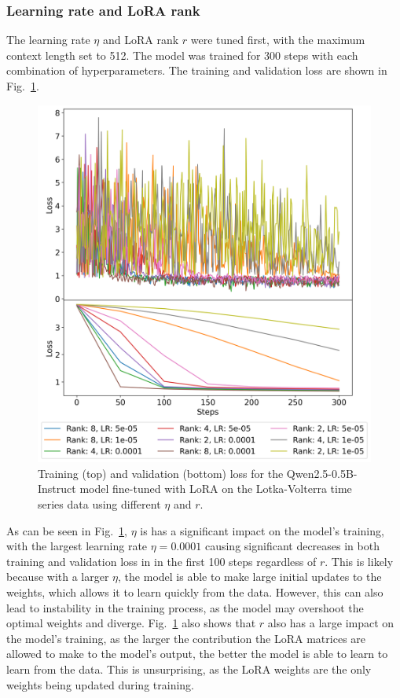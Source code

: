 \documentclass[11pt,a4paper]{article}
\begin{document}
\subsubsection{Learning rate and LoRA rank}
\label{sec:lora_lr}
The learning rate $\eta$ and LoRA rank $r$ were tuned first, with the maximum context length set to 512. The model was trained for 300 steps with each combination of hyperparameters. The training and validation loss are shown in Fig.~\ref{fig:lora_lr_rank_loss}.

\begin{figure}
    \centering
    \includegraphics[width=\columnwidth, keepaspectratio]{../plots/lora_lr_rank_loss.png}
    \caption{Training (top) and validation (bottom) loss for the Qwen2.5-0.5B-Instruct model fine-tuned with LoRA on the Lotka-Volterra time series data using different $\eta$ and $r$.}
    \label{fig:lora_lr_rank_loss}
\end{figure}

As can be seen in Fig.~\ref{fig:lora_lr_rank_loss}, $\eta$ is has a significant impact on the model's training, with the largest learning rate $\eta=0.0001$ causing significant decreases in both training and validation loss in in the first 100 steps regardless of $r$. This is likely because with a larger $\eta$, the model is able to make large initial updates to the weights, which allows it to learn quickly from the data. However, this can also lead to instability in the training process, as the model may overshoot the optimal weights and diverge. Fig.~\ref{fig:lora_lr_rank_loss} also shows that $r$ also has a large impact on the model's training, as the larger the contribution the LoRA matrices are allowed to make to the model's output, the better the model is able to learn to learn from the data. This is unsurprising, as the LoRA weights are the only weights being updated during training.
\end{document}
